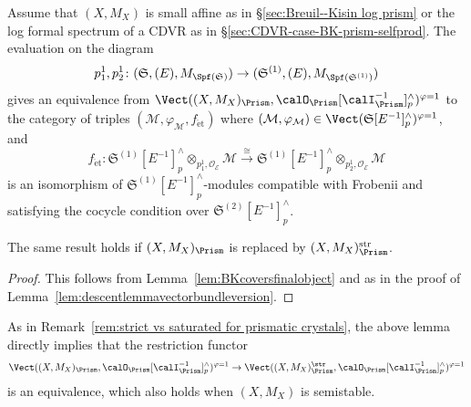 \begin{lem} \label{lem:equiv-Laurent-F-cryst-descent-datum}
Assume that $(X, M_X)$ is small affine as in \S\ref{sec:Breuil--Kisin log prism} or the log formal spectrum of a CDVR as in \S\ref{sec:CDVR-case-BK-prism-selfprod}.
The evaluation on the diagram
\[
p^1_1, p^1_2\colon (\mathfrak{S},(E), M_{\Spf(\mathfrak{S})}) \to (\mathfrak{S}^{(1)}, (E), M_{\Spf(\mathfrak{S}^{(1)})})
\]
gives an equivalence from $\Vect((X,M_X)_\Prism,\calO_\Prism[\calI_\Prism^{-1}]^\wedge_p)^{\varphi=1}$ to the category of triples $(\mathcal{M}, \varphi_{\mathcal{M}}, f_{\mathrm{\acute{e}t}})$ where $(\mathcal{M}, \varphi_{\mathcal{M}}) \in \Vect(\mathfrak{S}[E^{-1}]^\wedge_p)^{\varphi=1}$, and 
\[
f_{\mathrm{\acute{e}t}}\colon \mathfrak{S}^{(1)}[E^{-1}]^{\wedge}_p \otimes_{p^1_1, \mathcal{O}_{\mathcal{E}}} \mathcal{M} \stackrel{\cong}{\rightarrow} \mathfrak{S}^{(1)}[E^{-1}]^{\wedge}_p \otimes_{p^1_2, \mathcal{O}_{\mathcal{E}}} \mathcal{M}
\]
is an isomorphism of $\mathfrak{S}^{(1)}[E^{-1}]^{\wedge}_p$-modules compatible with Frobenii and satisfying the cocycle condition over $\mathfrak{S}^{(2)}[E^{-1}]^{\wedge}_p$.

The same result holds if $(X,M_X)_\Prism$ is replaced by $(X,M_X)_\Prism^{\mathrm{str}}$.
\end{lem}

\begin{proof}
This follows from Lemma~\ref{lem:BKcoversfinalobject} and \cite[Thm.~7.8]{mathew-descent} as in the proof of Lemma~\ref{lem:descentlemmavectorbundleversion}.
\end{proof}

\begin{rem} \label{rem:strict vs saturated for Laurent F crystals}
As in Remark~\ref{rem:strict vs saturated for prismatic crystals}, the above lemma directly implies that the restriction functor  
\[
\Vect((X,M_X)_\Prism,\calO_\Prism[\calI_\Prism^{-1}]^\wedge_p)^{\varphi=1} \rightarrow \Vect((X,M_X)_\Prism^{\str},\calO_\Prism[\calI_\Prism^{-1}]^\wedge_p)^{\varphi=1}
\]
is an equivalence, which also holds when $(X, M_X)$ is semistable.
\end{rem}

